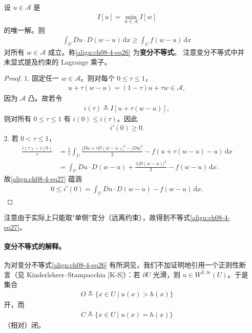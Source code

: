 \documentclass[../../main.tex]{subfiles}
\begin{document}
\begin{theorem}[极小元的变分刻画]\label{theorem:ch08-4-4-变分不等式}
设 $u\in\mathcal{A}$ 是
\begin{align*}
I[u]=\min_{w\in\mathcal{A}}I[w]
\end{align*}
的唯一解。则
\begin{align}
\int_U Du\cdot D(w-u)\,\mathrm{d}x\geqslant\int_U f(w-u)\,\mathrm{d}x\label{align:ch08-4-eq26}
\end{align}
对所有 $w\in\mathcal{A}$ 成立。称\eqref{align:ch08-4-eq26} 为\textbf{变分不等式}。
注意变分不等式中并未显式提及约束的 Lagrange 乘子。
\begin{proof}
1. 固定任一 $w\in\mathcal{A}$。则对每个 $0\leqslant\tau\leqslant 1$，
\begin{align*}
u+\tau(w-u)=(1-\tau)u+\tau w\in\mathcal{A},
\end{align*}
因为 $\mathcal{A}$ 凸。故若令
\begin{align*}
i(\tau)\triangleq I[u+\tau(w-u)],
\end{align*}
则对所有 $0\leqslant\tau\leqslant 1$ 有 $i(0)\leqslant i(\tau)$。因此
\begin{align}
i'(0)\geqslant 0.\label{align:ch08-4-eq27}
\end{align}
2. 若 $0<\tau\leqslant 1$，
\begin{align*}
\frac{i(\tau)-i(0)}{\tau}&=\frac1\tau\int_U\frac{|Du+\tau D(w-u)|^2-|Du|^2}{2}-f(u+\tau(w-u)-u)\,\mathrm{d}x\\
&=\int_U Du\cdot D(w-u)+\frac{\tau|D(w-u)|^2}{2}-f(w-u)\,\mathrm{d}x.
\end{align*}
故\eqref{align:ch08-4-eq27} 蕴涵
\begin{align*}
0\leqslant i'(0)=\int_U Du\cdot D(w-u)-f(w-u)\,\mathrm{d}x.
\end{align*}
\end{proof}
\end{theorem}

注意由于实际上只能取"单侧"变分（远离约束），故得到不等式\eqref{align:ch08-4-eq27}。

\paragraph{变分不等式的解释。}为对变分不等式\eqref{align:ch08-4-eq26} 有所洞见，我们不加证明地引用一个正则性断言（见 Kinderlehrer--Stampacchia [K-S]）：若 $\partial U$ 光滑，则 $u\in W^{2,\infty}(U)$。于是集合
\begin{align*}
O\triangleq\{x\in U\mid u(x)>h(x)\}
\end{align*}
开，而
\begin{align*}
C\triangleq\{x\in U\mid u(x)=h(x)\}
\end{align*}
（相对）闭。
\end{document}

